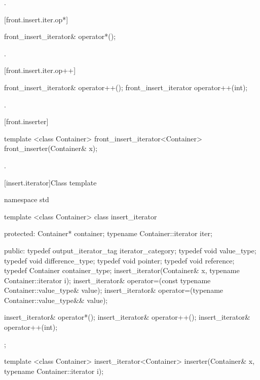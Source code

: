 \begin{itemdescr}
\pnum
\effects
{}

\pnum
\returns
{}.
\end{itemdescr}

[front.insert.iter.op*]{}

%
\begin{itemdecl}
front_insert_iterator& operator*();
\end{itemdecl}

\begin{itemdescr}
\pnum
\returns
{}.
\end{itemdescr}

[front.insert.iter.op++]{}

%
\begin{itemdecl}
front_insert_iterator& operator++();
front_insert_iterator  operator++(int);
\end{itemdecl}

\begin{itemdescr}
\pnum
\returns
{}.
\end{itemdescr}

[front.inserter]{}

%
\begin{itemdecl}
template <class Container>
  front_insert_iterator<Container> front_inserter(Container& x);
\end{itemdecl}

\begin{itemdescr}
\pnum
\returns
{}.
\end{itemdescr}

[insert.iterator]{Class template }

%
\begin{codeblock}
namespace std {
  template <class Container>
  class insert_iterator {
  protected:
    Container* container;
    typename Container::iterator iter;

  public:
    typedef output_iterator_tag iterator_category;
    typedef void value_type;
    typedef void difference_type;
    typedef void pointer;
    typedef void reference;
    typedef Container container_type;
    insert_iterator(Container& x, typename Container::iterator i);
    insert_iterator& operator=(const typename Container::value_type& value);
    insert_iterator& operator=(typename Container::value_type&& value);

    insert_iterator& operator*();
    insert_iterator& operator++();
    insert_iterator& operator++(int);
  };

  template <class Container>
    insert_iterator<Container> inserter(Container& x, typename Container::iterator i);
}
\end{codeblock}

